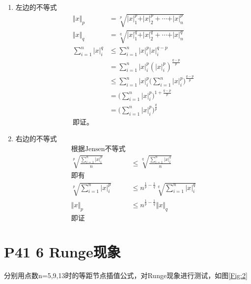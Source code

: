 \documentclass{article}%
\begin{document}
\begin{enumerate}
	
	\item 左边的不等式
	\begin{displaymath} 
	\begin{aligned}	 
	\Vert{x} \Vert_p & = \sqrt[p]{\vert x \vert_1^p+\vert x \vert_2^p+\cdots+\vert x \vert_n^p} \\
	\Vert{x} \Vert_q & = \sqrt[q]{\vert x \vert_1^q+\vert x \vert_2^q+\cdots+\vert x \vert_n^q} \\
	\sum _{i=1}^n{\vert x \vert_i^q} & \leq \sum _{i=1}^n{{\vert x \vert_i^p}{\vert x \vert_i^{q-p}}}\\
	& = \sum _{i=1}^n{\vert x \vert_i^p}{(\vert x \vert_i^{p})^{\frac{q-p}{p}}} \\
	& \leq \sum _{i=1}^n{\vert x \vert_i^p}(\sum _{i=1}^n{\vert x \vert_i^{p})^{\frac{q-p}{p}}} \\
	& = (\sum _{i=1}^n{\vert x \vert_i^{p})^{1+\frac{q-p}{p}}} \\
	& = (\sum _{i=1}^n{\vert x \vert_i^{p})^{\frac{q}{p}}} \\
	\text{即证。}
	\end{aligned}
	\end{displaymath}
	
		\item 右边的不等式
	\begin{displaymath} 
	\begin{aligned}	
	\text{根据Jensen不等式} \\
	\sqrt[p]{\frac{\sum _{i=1}^n{\vert x \vert_i^p}}{n}} & \leq \sqrt[q]{\frac{\sum _{i=1}^n{\vert x \vert_i^q}}{n}}\\
		\text{即有} \\
	\sqrt[p]{\sum _{i=1}^n{\vert x \vert_i^p}} & \leq n ^{ \frac{1}{p} - \frac{1}{q} }\sqrt[q]{\sum _{i=1}^n{\vert x \vert_i^q}}\\
	\Vert{x} \Vert_p & \leq n ^{ \frac{1}{p} - \frac{1}{q} }\Vert{x} \Vert_q\\
	\text{即证}
	\end{aligned}
	\end{displaymath}

\end{enumerate}

\newpage
\section{P41 6 Runge现象}
分别用点数n=5,9,13时的等距节点插值公式，对Runge现象进行测试，如图\ref{Fig:2}
\end{document}
